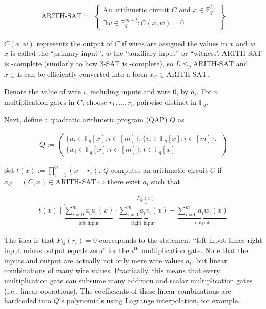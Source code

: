 \documentclass{article}
\begin{document}
\begin{align*}
        \text{ARITH-SAT} := \left\{\begin{aligned}\text{An arithmetic circuit } C \text{ and } x \in \mathbb{F}_q^l \colon \\
        \exists w \in \mathbb{F}_q^{m-l}\colon C(x,w) = 0\end{aligned}\right\}
\end{align*}

$C(x,w)$ represents the output of $C$ if wires are assigned the values in $x$ and $w$.
$x$ is called the ``primary input'', $w$ the ``auxiliary input'' or ``witness'.
ARITH-SAT is \NP-complete (similarly to how 3-SAT is \NP-complete), so $L \leq_p \text{ARITH-SAT}$ and $x \in L$ can be efficiently converted into a form $x_C \in \text{ARITH-SAT}$.

Denote the value of wire $i$, including inputs and wire $0$, by $a_i$.
For $n$ multiplication gates in $C$, choose $r_1, \ldots, r_n$ pairwise distinct in $\mathbb{F}_q$.

Next, define a quadratic arithmetic program (QAP) $Q$ as

\begin{align*}
        Q := \left(\begin{aligned}\{u_i \in \mathbb{F}_q[x] \colon i \in [m]\}, \{v_i \in \mathbb{F}_q[x] \colon i \in [m]\},\\
        \{w_i \in \mathbb{F}_q[x] \colon i \in [m]\}, t \in \mathbb{F}_q[x]\end{aligned}\right)
\end{align*}

Set $t(x) := \prod_{i=1}^n(x-r_i)$.
$Q$ computes an arithmetic circuit $C$ if $x_C = (C,x) \in \text{ARITH-SAT} \iff \text{there exist } a_i$ such that

\begin{align*}
        t(x) \mid \overbrace{\underbrace{\sum_{i=0}^m a_iu_i(x)}_\text{left input} \cdot \underbrace{\sum_{i=0}^m a_iv_i(x)}_\text{right input} - \underbrace{\sum_{i=0}^{m} a_iw_i(x)}_\text{output}}^\text{$P_Q(x)$}
\end{align*}

The idea is that $P_Q(r_i) = 0$ corresponds to the statement ``left input times right input minus output equals zero'' for the $i^\text{th}$ multiplication gate.
Note that the inputs and output are actually not only mere wire values $a_i$, but linear combinations of many wire values.
Practically, this means that every multiplication gate can subsume many addition and scalar multiplication gates (i.e., linear operations).
The coefficients of these linear combinations are hardcoded into $Q$'s polynomials using Lagrange interpolation, for example.
\end{document}
